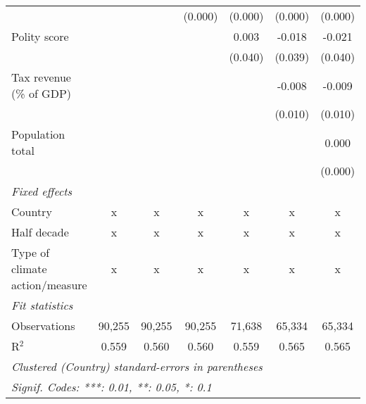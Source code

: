 \begin{tabular}{lcccccc}
                                                                                    &         &                & (0.000)        & (0.000)        & (0.000)        & (0.000)\\   
   Polity score                                                                     &         &                &                & 0.003          & -0.018         & -0.021\\   
                                                                                    &         &                &                & (0.040)        & (0.039)        & (0.040)\\   
   Tax revenue (\% of GDP)                                                          &         &                &                &                & -0.008         & -0.009\\   
                                                                                    &         &                &                &                & (0.010)        & (0.010)\\   
   Population total                                                                 &         &                &                &                &                & 0.000\\   
                                                                                    &         &                &                &                &                & (0.000)\\   
   \emph{Fixed effects}\\
   Country                                                                          & x       & x              & x              & x              & x              & x\\  
   Half decade                                                                      & x       & x              & x              & x              & x              & x\\  
   Type of climate action/measure                                                   & x       & x              & x              & x              & x              & x\\  
   \midrule \emph{Fit statistics}\\
   Observations                                                                     & 90,255  & 90,255         & 90,255         & 71,638         & 65,334         & 65,334\\  
   R$^2$                                                                            & 0.559   & 0.560          & 0.560          & 0.559          & 0.565          & 0.565\\  
   \midrule
   \multicolumn{7}{l}{\emph{Clustered (Country) standard-errors in parentheses}}\\
   \multicolumn{7}{l}{\emph{Signif. Codes: ***: 0.01, **: 0.05, *: 0.1}}\\
\end{tabular}
\par\endgroup


